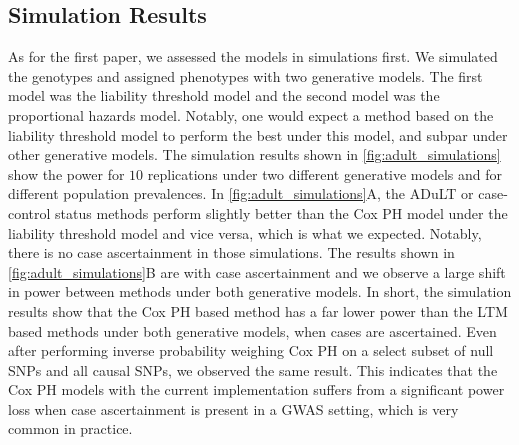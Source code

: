 \subsection{Simulation Results}

As for the first paper, we assessed the models in simulations first. We simulated the genotypes and assigned phenotypes with two generative models. The first model was the liability threshold model and the second model was the proportional hazards model. Notably, one would expect a method based on the liability threshold model to perform the best under this model, and subpar under other generative models. The simulation results shown in \cref{fig:adult_simulations} show the power for $ 10 $ replications under two different generative models and for different population prevalences. In \cref{fig:adult_simulations}A, the ADuLT or case-control status methods perform slightly better than the Cox PH model under the liability threshold model and vice versa, which is what we expected. Notably, there is no case ascertainment in those simulations. The results shown in \cref{fig:adult_simulations}B are with case ascertainment and we observe a large shift in power between methods under both generative models. In short, the simulation results show that the Cox PH based method has a far lower power than the LTM based methods under both generative models, when cases are ascertained. Even after performing inverse probability weighing Cox PH on a select subset of null SNPs and all causal SNPs, we observed the same result. This indicates that the Cox PH models with the current implementation suffers from a significant power loss when case ascertainment is present in a GWAS setting, which is very common in practice.


